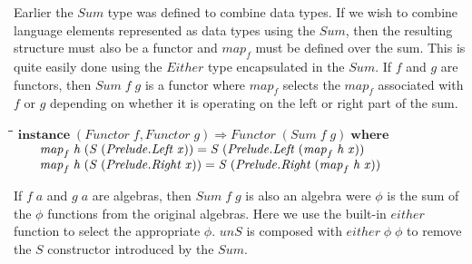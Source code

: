 \documentclass[11pt]{article}
\newlength{\lwidth}\setlength{\lwidth}{4.5cm}
\newlength{\cwidth}\setlength{\cwidth}{8mm} %
\newcommand{\Conid}[1]{\mathit{#1}}
\newcommand{\Varid}[1]{\mathit{#1}}
\begin{document}
Earlier the \ensuremath{\Conid{Sum}} type was defined to combine data types.  If we wish
to combine language elements represented as data types using the
\ensuremath{\Conid{Sum}}, then the resulting structure must also be a functor and \ensuremath{\Varid{map}_{f}}
must be defined over the sum. This is quite easily done using the
\ensuremath{\Conid{Either}} type encapsulated in the \ensuremath{\Conid{Sum}}.  If \ensuremath{\Varid{f}} and \ensuremath{\Varid{g}} are functors,
then \ensuremath{\Conid{Sum}\;\Varid{f}\;\Varid{g}} is a functor where \ensuremath{\Varid{map}_{f}} selects the \ensuremath{\Varid{map}_{f}} associated
with \ensuremath{\Varid{f}} or \ensuremath{\Varid{g}} depending on whether it is operating on the left or
right part of the sum.

\begin{tabbing}
\qquad\=\hspace{\lwidth}\=\hspace{\cwidth}\=\+\kill
${\mathbf{instance}\;(\Conid{Functor}\;\Varid{f},\Conid{Functor}\;\Varid{g})\Rightarrow \Conid{Functor}\;(\Conid{Sum}\;\Varid{f}\;\Varid{g})\;\mathbf{where}}$\\
${\hskip2.00em\relax\Varid{map}_{f}\;\Varid{h}\;(\Conid{S}\;(\Conid{\Conid{Prelude}.Left}\;\Varid{x}))\mathrel{=}\Conid{S}\;(\Conid{\Conid{Prelude}.Left}\;(\Varid{map}_{f}\;\Varid{h}\;\Varid{x}))}$\\
${\hskip2.00em\relax\Varid{map}_{f}\;\Varid{h}\;(\Conid{S}\;(\Conid{\Conid{Prelude}.Right}\;\Varid{x}))\mathrel{=}\Conid{S}\;(\Conid{\Conid{Prelude}.Right}\;(\Varid{map}_{f}\;\Varid{h}\;\Varid{x}))}$
\end{tabbing}
If \ensuremath{\Varid{f}\;\Varid{a}} and \ensuremath{\Varid{g}\;\Varid{a}} are algebras, then \ensuremath{\Conid{Sum}\;\Varid{f}\;\Varid{g}} is also an algebra
were \ensuremath{\Varid{\phi}} is the sum of the \ensuremath{\Varid{\phi}} functions from the original
algebras.  Here we use the built-in \ensuremath{\Varid{either}} function to select the
appropriate \ensuremath{\Varid{\phi}}.  \ensuremath{\Varid{unS}} is composed with \ensuremath{\Varid{either}\;\Varid{\phi}\;\Varid{\phi}} to remove
the \ensuremath{\Conid{S}} constructor introduced by the \ensuremath{\Conid{Sum}}.
\end{document}
